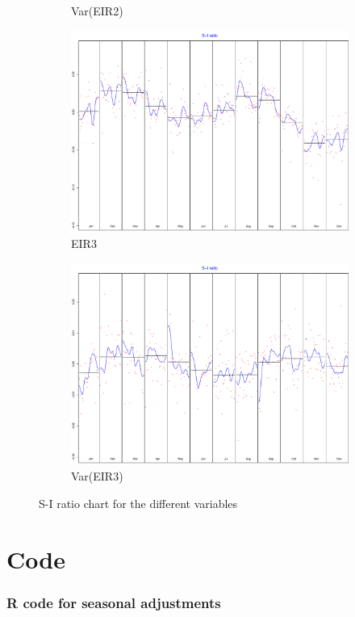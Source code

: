 \documentclass[12pt,a4paper,oneside]{book}
\begin{document}
\begin{figure}[H]
\begin{subfigure}{.5\textwidth}
  \caption{Var(EIR2)}
\end{subfigure}
\begin{subfigure}{.5\textwidth}
  \centering
  \includegraphics[width=.8\linewidth]{Graphs/S-I_7.pdf}
  \caption{EIR3}
\end{subfigure}
\begin{subfigure}{.5\textwidth}
  \centering
  \includegraphics[width=.8\linewidth]{Graphs/S-I_8.pdf}
  \caption{Var(EIR3)}
\end{subfigure}
\caption{S-I ratio chart for the different variables}
\label{fig:S-I seasonal correction RJDemetra}
\end{figure}






\chapter*{Code}
\subsection*{R code for seasonal adjustments}
\end{document}
